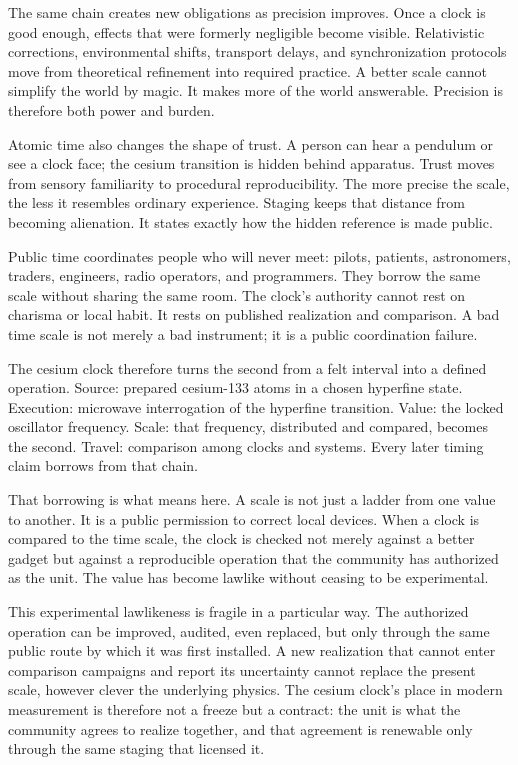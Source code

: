 The same chain creates new obligations as precision improves. Once a
clock is good enough, effects that were formerly negligible become
visible. Relativistic corrections, environmental shifts, transport
delays, and synchronization protocols move from theoretical refinement
into required practice. A better scale cannot simplify the world by
magic. It makes more of the world answerable. Precision is therefore both
power and burden.

Atomic time also changes the shape of trust. A person can hear a pendulum
or see a clock face; the cesium transition is hidden behind apparatus.
Trust moves from sensory familiarity to procedural reproducibility. The
more precise the scale, the less it resembles ordinary experience.
Staging keeps that distance from becoming alienation. It states exactly
how the hidden reference is made public.

Public time coordinates people who will never meet: pilots, patients,
astronomers, traders, engineers, radio operators, and programmers. They
borrow the same scale without sharing the same room. The clock's
authority cannot rest on charisma or local habit. It rests on published
realization and comparison. A bad time scale is not merely a bad
instrument; it is a public coordination failure.

The cesium clock therefore turns the second from a felt interval into a
defined operation. Source: prepared cesium-133 atoms in a chosen hyperfine
state. Execution: microwave interrogation of the hyperfine transition.
Value: the locked oscillator frequency. Scale: that frequency,
distributed and compared, becomes the second. Travel: comparison among
clocks and systems. Every later timing claim borrows from that chain.

That borrowing is what  means here. A scale is not just a
ladder from one value to another. It is a public permission to correct
local devices. When a clock is compared to the time scale, the clock is
checked not merely against a better gadget but against a reproducible
operation that the community has authorized as the unit. The value has
become lawlike without ceasing to be experimental.

This experimental lawlikeness is fragile in a particular way. The
authorized operation can be improved, audited, even replaced, but only
through the same public route by which it was first installed. A new
realization that cannot enter comparison campaigns and report its
uncertainty cannot replace the present scale, however clever the
underlying physics. The cesium clock's place in modern measurement is
therefore not a freeze but a contract: the unit is what the community
agrees to realize together, and that agreement is renewable only through
the same staging that licensed it.

